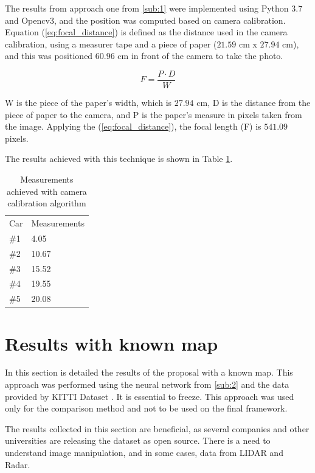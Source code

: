 The results from approach one from \ref{sub:1} were implemented using Python 3.7 and Opencv3, and the position was computed based on camera calibration. Equation (\ref{eq:focal_distance}) is defined as the distance used in the camera calibration, using a measurer tape and a piece of paper ($21.59$ cm x  $27.94$ cm), and this was positioned $60.96$ cm in front of the camera to take the photo.

\begin{equation}
    \label{eq:focal_distance}
    F = \frac{P\cdot D}{W}
\end{equation}

W is the piece of the paper's width, which is $27.94$ cm, D is the distance from the piece of paper to the camera, and P is the paper's measure in pixels taken from the image. Applying the (\ref{eq:focal_distance}), the focal length (F) is $541.09$ pixels.





The results achieved with this technique is shown in Table \ref{tab:output_calibrate}. 

\begin{table}[H]
\centering
\caption{Measurements achieved with camera calibration algorithm}
\begin{tabular}{l|l} 
\toprule
Car &  Measurements      \\
\#1   & 4.05        \\
\#2   & 10.67       \\
\#3   & 15.52       \\
\#4   & 19.55       \\
\#5   & 20.08       \\
\bottomrule
\end{tabular}
\label{tab:output_calibrate}
\end{table} 



\section{Results with known map}
In this section is detailed the results of the proposal with a known map. This approach was performed using the neural network from \ref{sub:2} and the data provided by KITTI Dataset \cite{geiger2013vision}. It is essential to freeze. This approach was used only for the comparison method and not to be used on the final framework. 


The results collected in this section are beneficial, as several companies and other universities are releasing the dataset as open source. There is a need to understand image manipulation, and in some cases, data from LIDAR and Radar.

